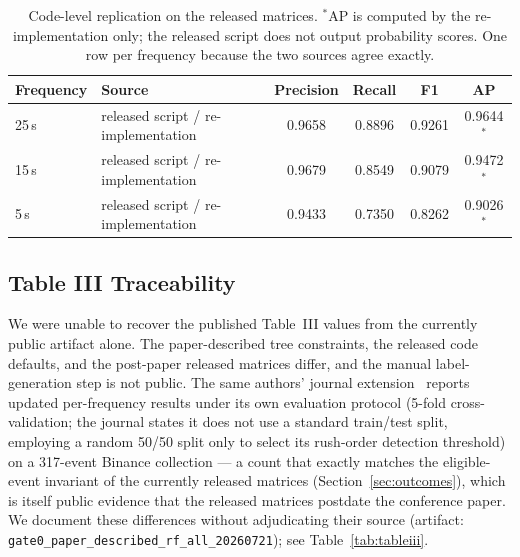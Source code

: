 \documentclass[runningheads]{llncs}
\begin{document}
\begin{table}[t]
\centering
\caption{Code-level replication on the released matrices.
$^*$AP is computed by the re-implementation only; the released script
does not output probability scores. One row per frequency because the
two sources agree exactly.}
\label{tab:replication}
\footnotesize
\setlength{\tabcolsep}{4pt}
\begin{tabular}{llcccc}
\toprule
Frequency & Source & Precision & Recall & F1 & AP \\
\midrule
25\,s & released script / re-implementation & 0.9658 & 0.8896 & 0.9261 & 0.9644$^*$ \\
15\,s & released script / re-implementation & 0.9679 & 0.8549 & 0.9079 & 0.9472$^*$ \\
5\,s  & released script / re-implementation & 0.9433 & 0.7350 & 0.8262 & 0.9026$^*$ \\
\bottomrule
\end{tabular}
\end{table}

\subsection{Table III Traceability}\label{sec:tableiii}

We were unable to recover the published Table~III values from the
currently public artifact alone. The paper-described tree constraints,
the released code defaults, and the post-paper released matrices
differ, and the manual label-generation step is not public. The same
authors' journal extension~\cite{LaMorgia2023} reports updated
per-frequency results under its own evaluation protocol (5-fold
cross-validation; the journal states it does not use a standard
train/test split, employing a random 50/50 split only to select its
rush-order detection threshold) on a 317-event Binance collection ---
a count that exactly matches the eligible-event invariant of the
currently released matrices (Section~\ref{sec:outcomes}), which is
itself public evidence that the released matrices postdate the
conference paper. We document these differences without adjudicating
their source (artifact:
\texttt{gate0\_paper\_described\_rf\_all\_20260721}); see
Table~\ref{tab:tableiii}.
\end{document}
